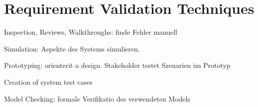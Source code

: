 \section{Requirement Validation Techniques}
\begin{compactitem}
    \item Inspection, Reviews, Walkthroughs: finde Fehler manuell
    \item Simulation: Aspekte des Systems simulieren.
    \item Prototyping: orienterit a design. Stakeholder testet Szenarien im
    Prototyp
    \item Creation of system test cases
    \item Model Checking: formale Verifikatio des verwendeten Models
\end{compactitem}
